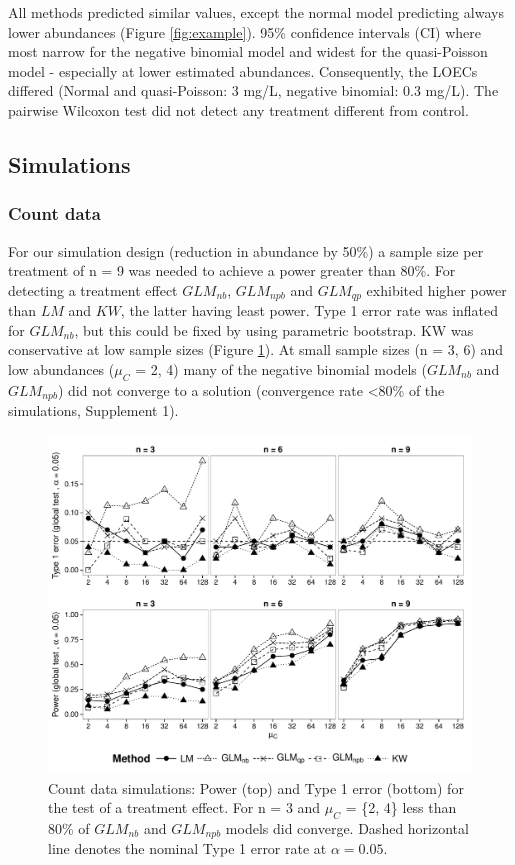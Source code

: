 \documentclass[twocolumn, natbib]{svjour3}
\begin{document}
All methods predicted similar values, except the normal model predicting always lower abundances (Figure \ref{fig:example}). 
95\% confidence intervals (CI) where most narrow for the negative binomial model and widest for the quasi-Poisson model - especially at lower estimated abundances.
Consequently, the LOECs differed (Normal and quasi-Poisson: 3 mg/L, negative binomial: 0.3 mg/L).
The pairwise Wilcoxon test did not detect any treatment different from control.


\subsection{Simulations}
\subsubsection{Count data}
For our simulation design (reduction in abundance by 50\%) a sample size per treatment of n = 9 was needed to achieve a power greater than 80\%.
For detecting a treatment effect $GLM_{nb}$, $GLM_{npb}$ and $GLM_{qp}$ exhibited higher power than $LM$ and $KW$, the latter having least power.
Type 1 error rate was inflated for $GLM_{nb}$, but this could be fixed by using parametric bootstrap.
KW was conservative at low sample sizes (Figure \ref{fig:p_glob_c}).
At small sample sizes (n = {3, 6}) and low abundances ($\mu_C$ = {2, 4}) many of the negative binomial models ($GLM_{nb}$ and $GLM_{npb}$) did not converge to a solution (convergence rate \textless 80\% of the simulations, Supplement 1). 

\begin{figure}
  \centering
  \includegraphics[width = 129mm]{p_glob_c.pdf}
  \caption{Count data simulations: Power (top) and Type 1 error (bottom) for the test of a treatment effect.
  For n = 3 and $\mu_C$ = \{2, 4\} less than 80\% of $GLM_{nb}$ and $GLM_{npb}$ models did converge.
  Dashed horizontal line denotes the nominal Type 1 error rate at $\alpha = 0.05$.
  }
  \label{fig:p_glob_c}
\end{figure}
\end{document}
